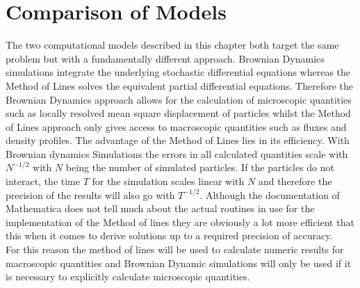 \section{Comparison of Models}
The two computational models described in this chapter both target the same problem but with a fundamentally different approach. Brownian Dynamics simulations integrate the underlying stochastic differential equations whereas the Method of Lines solves the equivalent partial differential equations. Therefore the Brownian Dynamics approach allows for the calculation of microscopic quantities such as locally resolved mean square displacement of particles whilst the Method of Lines approach only gives access to macroscopic quantities such as fluxes and density profiles. The advantage of the Method of Lines lies in its efficiency. With Brownian dynamics Simulations the errors in all calculated quantities scale with $N^{-1/2}$ with $N$ being the number of simulated particles. If the particles do not interact, the time $T$ for the simulation scales linear with $N$ and therefore the precision of the results will also go with $T^{-1/2}$. Although the documentation of Mathematica does not tell much about the actual routines in use for the implementation of the Method of lines they are obviously a lot more efficient that this when it comes to derive solutions up to a required precision of accuracy. \\
For this reason the method of lines will be used to calculate numeric results for macroscopic quantities and Brownian Dynamic simulations will only be used if it is necessary to explicitly calculate microscopic quantities.

